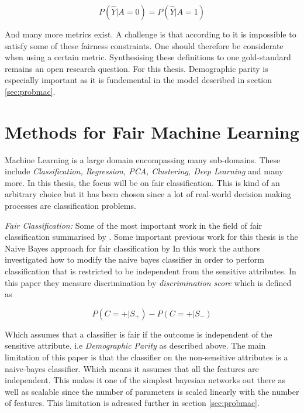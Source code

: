 \begin{equation}
    P(\hat{Y}|A=0) = P(\hat{Y}|A=1)
\end{equation}

And many more metrics exist. A challenge is that according to \citet{Mehrabi:2021:CSUR, Kleinberg:2017:LIPIcs} it is impossible to satisfy some of these fairness constraints. One should therefore be considerate when using a certain metric. Synthesising these definitions to one gold-standard remains an open research question. For this thesis. Demographic parity is especially important as it is fundemental in the model described in section \ref{sec:probmac}.

\section{Methods for Fair Machine Learning}

Machine Learning is a large domain encompassing many sub-domains. These include \textit{Classification, Regression, PCA, Clustering, Deep Learning} and many more. In this thesis, the focus will be on fair classification. This is kind of an arbitrary choice but it has been chosen since a lot of real-world decision making processes are classification problems. 

\textit{Fair Classification:} Some of the most important work in the field of fair classification summarised by \cite{Mehrabi:2021:CSUR}. Some important previous work for this thesis is the Naive Bayes approach for fair classification by \citet{Calders:20210:DMKD} In this work the authors investigated how to modify the naive bayes classifier in order to perform classification that is restricted to be independent from the sensitive attributes. In this paper they measure discrimination by \textit{discrimination score} which is defined as

\begin{equation}
    P(C=+|S_+) - P(C=+|S_-)
\end{equation}

Which assumes that a classifier is fair if the outcome is independent of the sensitive attribute. i.e \textit{Demographic Parity} as described above. The main limitation of this paper is that the classifier on the non-sensitive attributes is a naive-bayes classifier. Which means it assumes that all the features are independent. This makes it one of the simplest bayesian networks out there as well as scalable since the number of parameters is scaled linearly with the number of features. This limitation is adressed further in section \ref{sec:probmac}.

